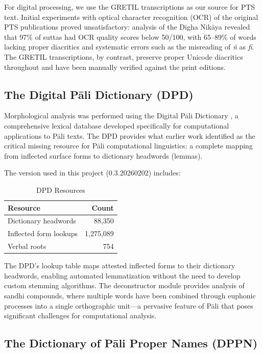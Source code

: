 \documentclass[unnumsec,webpdf,contemporary,large]{oup-authoring-template}
\begin{document}
For digital processing, we use the GRETIL transcriptions as our source for PTS text. Initial experiments with optical character recognition (OCR) of the original PTS publications proved unsatisfactory: analysis of the Dīgha Nikāya revealed that 97\% of suttas had OCR quality scores below 50/100, with 65–89\% of words lacking proper diacritics and systematic errors such as the misreading of \emph{ñ} as \emph{fi}. The GRETIL transcriptions, by contrast, preserve proper Unicode diacritics throughout and have been manually verified against the print editions.

\subsection{The Digital Pāli Dictionary (DPD)}

Morphological analysis was performed using the Digital Pāli Dictionary \citep{dpd2026}, a comprehensive lexical database developed specifically for computational applications to Pāli texts. The DPD provides what earlier work identified as the critical missing resource for Pāli computational linguistics: a complete mapping from inflected surface forms to dictionary headwords (lemmas).

The version used in this project (0.3.20260202) includes:

\begin{table}[h]
\centering
\caption{DPD Resources}
\begin{tabular}{lr}
\toprule
Resource & Count \\
\midrule
Dictionary headwords & 88,350 \\
Inflected form lookups & 1,275,089 \\
Verbal roots & 754 \\
\bottomrule
\end{tabular}
\end{table}

The DPD's lookup table maps attested inflected forms to their dictionary headwords, enabling automated lemmatization without the need to develop custom stemming algorithms. The deconstructor module provides analysis of sandhi compounds, where multiple words have been combined through euphonic processes into a single orthographic unit—a pervasive feature of Pāli that poses significant challenges for computational analysis.

\subsection{The Dictionary of Pāli Proper Names (DPPN)}
\end{document}
